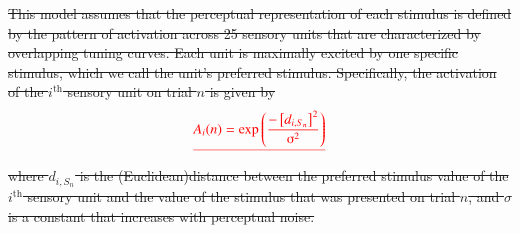 \documentclass[doc, floatsintext]{apa7}
\providecommand{\DIFdel}[1]{{\protect\color{red}\sout{#1}}}                      %
\begin{document}
\DIFdel{This model assumes that the perceptual representation of
each stimulus is defined by the pattern of activation across
25 sensory units that are characterized by overlapping
tuning curves. Each unit is maximally excited by one
specific stimulus, which we call the unit's preferred
stimulus. Specifically, the activation of the $i^\text{th}$
sensory unit on trial $n$ is given by
}\begin{displaymath}
  \DIFdel{A_i(n) = \text{exp} \left( \frac{-\left[d_{i,S_n}\right]^2}{\sigma^2} \right)
}\end{displaymath}%
\DIFdel{where $d_{i,S_n}$ is the (Euclidean)distance between the preferred
stimulus value of the $i^\text{th}$ sensory unit and the
value of the stimulus that was presented on trial $n$, and $\sigma$ is a constant that increases with perceptual noise.
}%
\end{document}
